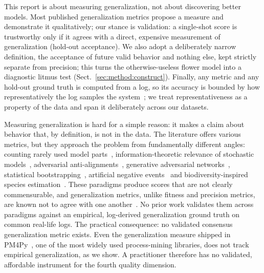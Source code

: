 \documentclass[runningheads]{llncs}
\begin{document}
This report is about measuring generalization, not about discovering better models. Most published generalization metrics propose a measure and demonstrate it qualitatively; our stance is validation: a single-shot score is trustworthy only if it agrees with a direct, expensive measurement of generalization (hold-out acceptance). We also adopt a deliberately narrow definition, the acceptance of future valid behavior and nothing else, kept strictly separate from precision; this turns the otherwise-useless flower model into a diagnostic litmus test (Sect.~\ref{sec:method:construct}). Finally, any metric and any hold-out ground truth is computed from a log, so its accuracy is bounded by how representatively the log samples the system~\cite{karunaratne2024representativeness}; we treat representativeness as a property of the data and span it deliberately across our datasets.

Measuring generalization is hard for a simple reason: it makes a claim about behavior that, by definition, is not in the data. The literature offers various metrics, but they approach the problem from fundamentally different angles: counting rarely used model parts~\cite{buijs2014quality}, information-theoretic relevance of stochastic models~\cite{alkhammash2022entropic}, adversarial anti-alignments~\cite{vandongen2016anti}, generative adversarial networks~\cite{theis2020avatar}, statistical bootstrapping~\cite{polyvyanyy2022bootstrap}, artificial negative events~\cite{vandenbroucke2014negative} and biodiversity-inspired species estimation~\cite{kabierski2023species}. These paradigms produce scores that are not clearly commensurable, and generalization metrics, unlike fitness and precision metrics, are known not to agree with one another~\cite{janssenswillen2017comparative}. No prior work validates them across paradigms against an empirical, log-derived generalization ground truth on common real-life logs. The practical consequence: no validated consensus generalization metric exists. Even the generalization measure shipped in PM4Py~\cite{berti2019pm4py}, one of the most widely used process-mining libraries, does not track empirical generalization, as we show. A practitioner therefore has no validated, affordable instrument for the fourth quality dimension.
\end{document}
